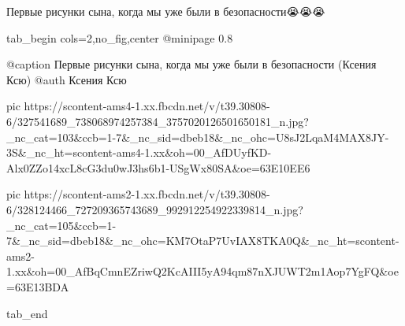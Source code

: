  
 
 
 
 


Первые рисунки сына, когда мы уже были в безопасности😭😭😭

\ifcmt
  tab_begin cols=2,no_fig,center
     @minipage 0.8

     @caption Первые рисунки сына, когда мы уже были в безопасности (Ксения Ксю)
     @auth Ксения Ксю

     pic https://scontent-ams4-1.xx.fbcdn.net/v/t39.30808-6/327541689_738068974257384_3757020126501650181_n.jpg?_nc_cat=103&ccb=1-7&_nc_sid=dbeb18&_nc_ohc=U8sJ2LqaM4MAX8JY-3S&_nc_ht=scontent-ams4-1.xx&oh=00_AfDUyfKD-Alx0ZZo14xcL8cG3du0wJ3hs6b1-USgWx80SA&oe=63E10EE6

     pic https://scontent-ams2-1.xx.fbcdn.net/v/t39.30808-6/328124466_727209365743689_992912254922339814_n.jpg?_nc_cat=105&ccb=1-7&_nc_sid=dbeb18&_nc_ohc=KM7OtaP7UvIAX8TKA0Q&_nc_ht=scontent-ams2-1.xx&oh=00_AfBqCmnEZriwQ2KcAIII5yA94qm87nXJUWT2m1Aop7YgFQ&oe=63E13BDA

  tab_end
\fi

